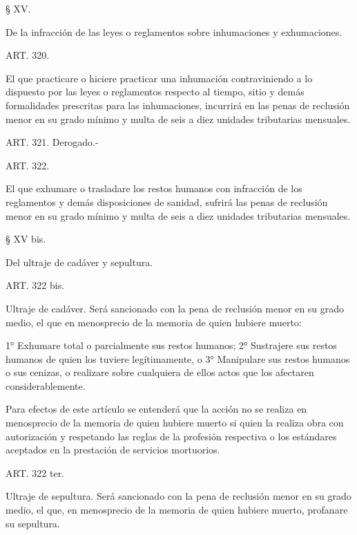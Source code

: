     § XV.

    De la infracción de las leyes o reglamentos sobre inhumaciones y exhumaciones.





    ART. 320.

    El que practicare o hiciere practicar una inhumación contraviniendo a lo dispuesto por las leyes o reglamentos respecto al tiempo, sitio y demás formalidades prescritas para las inhumaciones, incurrirá en las penas de reclusión menor en su grado mínimo y multa de seis a diez unidades tributarias mensuales.








    ART. 321.  Derogado.-



    ART. 322.

    El que exhumare o trasladare los restos humanos con infracción de los reglamentos y demás disposiciones de sanidad, sufrirá las penas de reclusión menor en su grado mínimo y multa de seis a diez unidades tributarias mensuales.








    § XV bis.

    Del ultraje de cadáver y sepultura.


     
    ART. 322 bis.

    Ultraje de cadáver. Será sancionado con la pena de reclusión menor en su grado medio, el que en menosprecio de la memoria de quien hubiere muerto:
     
    1° Exhumare total o parcialmente sus restos humanos;
    2° Sustrajere sus restos humanos de quien los tuviere legítimamente, o
    3° Manipulare sus restos humanos o sus cenizas, o realizare sobre cualquiera de ellos actos que los afectaren considerablemente.
     
    Para efectos de este artículo se entenderá que la acción no se realiza en menosprecio de la memoria de quien hubiere muerto si quien la realiza obra con autorización y respetando las reglas de la profesión respectiva o los estándares aceptados en la prestación de servicios mortuorios.
     
    ART. 322 ter.

    Ultraje de sepultura. Será sancionado con la pena de reclusión menor en su grado medio, el que, en menosprecio de la memoria de quien hubiere muerto, profanare su sepultura.

